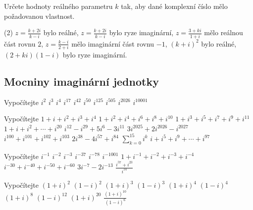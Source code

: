 \begin{exercise}{Určete hodnoty reálného parametru $k$ tak, aby dané komplexní číslo mělo požadovanou vlastnost.}
    \begin{tasks}(2)
        \task $\displaystyle z=\frac{k+2i}{k-i}$ bylo reálné,
        \task $\displaystyle z=\frac{k+2i}{k-i}$ bylo ryze imaginární,
        \task $\displaystyle z=\frac{3+ki}{1+i}$ mělo reálnou část rovnu $2$,
        \task $\displaystyle z=\frac{k-i}{2+i}$ mělo imaginární část rovnu $-1$,
        \task $(k+i)^2$ bylo reálné,
        \task $(2+ki)(1-i)$ bylo ryze imaginární.
    \end{tasks}
\end{exercise}



\subsection*{Mocniny imaginární jednotky}

\begin{exerciseblock}[5]{Vypočítejte}
    \task $i^2$
    \task $i^3$
    \task $i^4$
    \task $i^{17}$
    \task $i^{42}$
    \task $i^{50}$
    \task $i^{125}$
    \task $i^{505}$
    \task $i^{2026}$
    \task $i^{10001}$
\end{exerciseblock}


\begin{exerciseblock}[2]{Vypočítejte}
    \task $1+i+i^2+i^3+i^4$
    \task $1+i^2+i^4+i^6+i^8+i^{10}$
    \task $1+i^3+i^5+i^7+i^9+i^{11}$
    \task $1+i+i^2+\cdots+i^{20}$
    \task $i^{12}-i^{29}+5i^{6}-3i^{11}$
    \task $3i^{2025}+2i^{2026}-i^{2027}$
    \task $i^{100}+i^{101}+i^{102}+i^{103}$
    \task $2i^{38}-4i^{57}+i^{84}$
    \task $\displaystyle \sum_{k=0}^{15}i^k$
    \task $\displaystyle i+i^5+i^9+\cdots+i^{97}$
\end{exerciseblock}


\begin{exerciseblock}[2]{Vypočítejte}
    \task $i^{-1}$
    \task $i^{-2}$
    \task $i^{-3}$
    \task $i^{-37}$
    \task $i^{-78}$
    \task $i^{-1001}$
    \task $1+i^{-1}+i^{-2}+i^{-3}+i^{-4}$
    \task $i^{-30}+i^{-40}+i^{-50}+i^{-60}$
    \task $3i^{-7}-2i^{-13}$
    \task $\displaystyle \frac{i^{57}+i^{23}}{i^{14}}$
\end{exerciseblock}


\begin{exerciseblock}[2]{Vypočítejte}
    \task $(1+i)^2$
    \task $(1-i)^2$
    \task $(1+i)^3$
    \task $(1-i)^3$
    \task $(1+i)^4$
    \task $(1-i)^4$
    \task $(1+i)^8$
    \task $(1-i)^{12}$
    \task $(1+i)^{20}$
    \task $\displaystyle \frac{(1+i)^{10}}{(1-i)^6}$
\end{exerciseblock}


